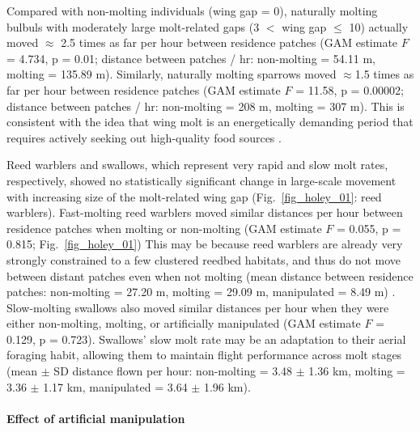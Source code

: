 \begin{refsection}
Compared with non-molting individuals (wing gap = 0), naturally molting bulbuls with moderately large molt-related gaps (3 $<$ wing gap $\leq$ 10) actually moved $\approx$ 2.5 times as far per hour between residence patches (GAM estimate $F$ = 4.734, p = 0.01; distance between patches / hr: non-molting = 54.11 m, molting = 135.89 m).
Similarly, naturally molting sparrows moved {$\approx$1.5 times} as far per hour between residence patches (GAM estimate $F$ = 11.58, p = 0.00002; distance between patches / hr: non-molting = 208 m, molting = 307 m).
This is consistent with the idea that wing molt is an energetically demanding period that requires actively seeking out high-quality food sources \citep{madsen1987,fox1998}.

Reed warblers and swallows, which represent very rapid and slow molt rates, respectively, showed no statistically significant change in large-scale movement with increasing size of the molt-related wing gap (Fig.~\ref{fig_holey_01}: reed warblers).
Fast-molting reed warblers moved similar distances per hour between residence patches when molting or non-molting (GAM estimate $F$ = 0.055, p = 0.815; Fig.~\ref{fig_holey_01})
This may be because reed warblers are already very strongly constrained to a few clustered reedbed habitats, and thus do not move between distant patches even when not molting (mean distance between residence patches: non-molting = 27.20 m, molting = 29.09 m, manipulated = 8.49 m) \citep{kiat2016}.
Slow-molting swallows also moved similar distances per hour when they were either non-molting, molting, or artificially manipulated (GAM estimate $F$ = 0.129, p = 0.723).
Swallows' slow molt rate may be an adaptation to their aerial foraging habit, allowing them to maintain flight performance across molt stages (mean $\pm$ SD distance flown per hour: non-molting = 3.48 $\pm$ 1.36 km, molting = 3.36 $\pm$ 1.17 km, manipulated = 3.64 $\pm$ 1.96 km).

\paragraph*{Effect of artificial manipulation}


\end{refsection}
